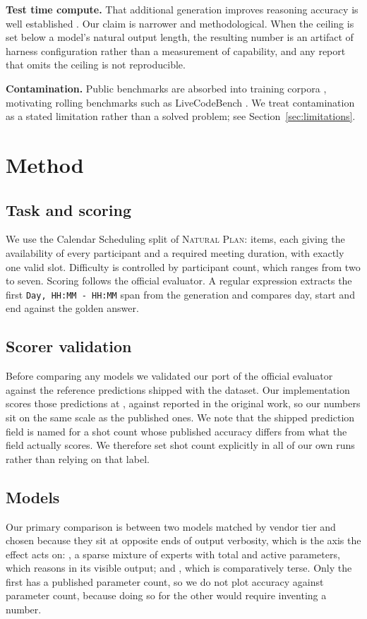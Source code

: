 \documentclass[10pt,twocolumn]{article}
\begin{document}
\textbf{Test time compute.} That additional generation improves reasoning
accuracy is well established \cite{wei2022chain,snell2024scaling}. Our claim is
narrower and methodological. When the ceiling is set below a model's natural
output length, the resulting number is an artifact of harness configuration
rather than a measurement of capability, and any report that omits the ceiling
is not reproducible.

\textbf{Contamination.} Public benchmarks are absorbed into training corpora
\cite{sainz2023nlpcontamination}, motivating rolling benchmarks such as
LiveCodeBench \cite{jain2024livecodebench}. We treat contamination as a stated
limitation rather than a solved problem; see Section~\ref{sec:limitations}.

\section{Method}

\subsection{Task and scoring}
We use the Calendar Scheduling split of \textsc{Natural Plan}: \datasetSize{}
items, each giving the availability of every participant and a required meeting
duration, with exactly one valid slot. Difficulty is controlled by participant
count, which ranges from two to seven. Scoring follows the official evaluator. A
regular expression extracts the first \texttt{Day, HH:MM - HH:MM} span from the
generation and compares day, start and end against the golden answer.

\subsection{Scorer validation}
Before comparing any models we validated our port of the official evaluator
against the reference predictions shipped with the dataset. Our implementation
scores those predictions at \geminiPublishedRepro{}, against
\geminiPublishedPaper{} reported in the original work, so our numbers sit on the
same scale as the published ones. We note that the shipped prediction field is
named for a shot count whose published accuracy differs from what the field
actually scores. We therefore set shot count explicitly in all of our own runs
rather than relying on that label.

\subsection{Models}
Our primary comparison is between two models matched by vendor tier and chosen
because they sit at opposite ends of output verbosity, which is the axis the
effect acts on: \nemotronName{}, a sparse mixture of experts
\cite{shazeer2017outrageously} with \nemotronTotalParams{} total and
\nemotronActiveParams{} active parameters, which reasons in its visible output;
and \claudeName{}, which is comparatively terse. Only the first has a published
parameter count, so we do not plot accuracy against parameter count, because
doing so for the other would require inventing a number.
\end{document}
